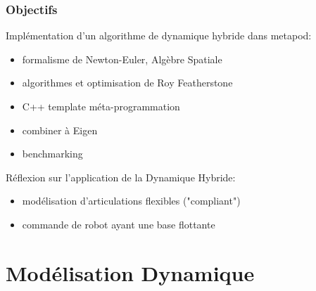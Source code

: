 \documentclass[10pt]{beamer}
\begin{document}
\begin{frame}
  \frametitle{Objectifs}
  
  \begin{block}{Implémentation d'un algorithme de dynamique hybride dans metapod:}
	\begin{itemize}
		\item formalisme de Newton-Euler, Algèbre Spatiale
		\item algorithmes et optimisation de Roy Featherstone
		\item C++ template méta-programmation
		\item combiner à Eigen 
		\item benchmarking
  \end{itemize}
  \end{block}
	
	\bigskip
  Réflexion sur l'application de la Dynamique Hybride:
  	\begin{itemize}
		\item modélisation d'articulations flexibles ("compliant")
		\item commande de robot ayant une base flottante
  \end{itemize}
	
\end{frame}

\section{Modélisation Dynamique}
\end{document}
